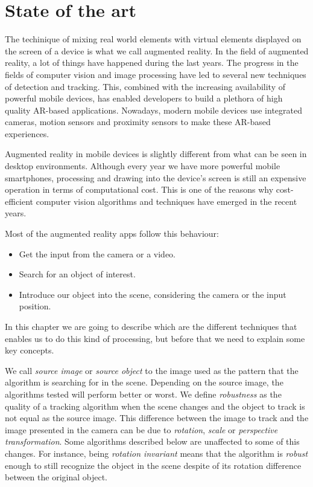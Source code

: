 \chapter{State of the art}
\label{chap:sota}
The techinique of
mixing real world elements with virtual elements displayed on the screen of a
device is what we call augmented reality. In the field of augmented reality, a
lot of things have happened during the last years. The progress in the fields
of computer vision and image processing have led to several new techniques of
detection and tracking. This, combined with the increasing availability of
powerful mobile devices, has enabled developers to build a plethora of high
quality AR-based applications. Nowadays, modern mobile devices use integrated
cameras, motion sensors and proximity sensors to make these AR-based experiences. 

Augmented reality in mobile devices is slightly different from what can be seen in
desktop environments. Although every year we have more powerful mobile
smartphones, processing and drawing into the device's screen is still an 
expensive operation in terms of computational cost. This is one of the reasons why
cost-efficient computer vision algorithms and techniques have emerged in the recent
years. 

Most of the augmented reality apps follow this behaviour:
\begin{itemize}
\item Get the input from the camera or a video.
\item Search for an object of interest.
\item Introduce our object into the scene, considering the camera or the input position.
\end{itemize}

In this chapter we are going to describe which are the different techniques
that enables us to do this kind of processing, but before that we need to
explain some key concepts. 

We call \emph{source image} or \emph{source object} to the image used as the pattern
that the algorithm is searching for in the scene. Depending on the source image, the
algorithms tested will perform better or worst. We define \emph{robustness} as the
quality of a tracking 
algorithm when the scene changes and the object to track is not equal as the
source image. This difference between the image to track and the image
presented in the camera can be due to \emph{rotation}, \emph{scale} or
\emph{perspective transformation}. Some algorithms described below are
unaffected to some of this changes. For instance, being \emph{rotation
  invariant} means that the algorithm is \emph{robust} enough to still
recognize the object in the scene despite of its rotation difference between
the original object.

